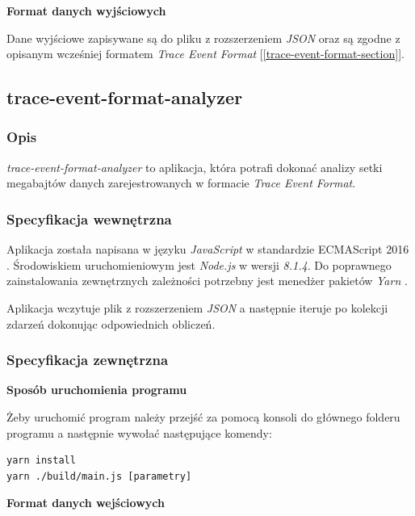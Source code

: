\documentclass[polish, twoside, 12pt]{mwart}
\begin{document}
\textbf{Format danych wyjściowych} \newline

Dane wyjściowe zapisywane są do pliku z rozszerzeniem \emph{JSON} oraz są zgodne z opisanym wcześniej formatem \emph
{Trace Event Format} [\ref{trace-event-format-section}].

\subsection{trace-event-format-analyzer}

\subsubsection{Opis}

\emph{trace-event-format-analyzer} to aplikacja, która potrafi dokonać analizy setki megabajtów danych zarejestrowanych w formacie \emph{Trace Event Format}.

\subsubsection{Specyfikacja wewnętrzna}

Aplikacja została napisana w języku \emph{JavaScript} w standardzie ECMAScript 2016 \cite{es2016}. Środowiskiem uruchomieniowym jest \emph{Node.js} \cite{node.js} w wersji \emph{8.1.4}. Do poprawnego zainstalowania zewnętrznych zależności potrzebny jest menedżer pakietów \emph{Yarn} \cite{yarn}.

Aplikacja wczytuje plik z rozszerzeniem \emph{JSON} a następnie iteruje po kolekcji zdarzeń dokonując odpowiednich obliczeń.

\subsubsection{Specyfikacja zewnętrzna}

\textbf{Sposób uruchomienia programu} \newline

Żeby uruchomić program należy przejść za pomocą konsoli do głównego folderu programu a następnie wywołać następujące komendy:

\begin{lstlisting}
yarn install
yarn ./build/main.js [parametry]
\end{lstlisting}

\textbf{Format danych wejściowych} \newline
\end{document}
